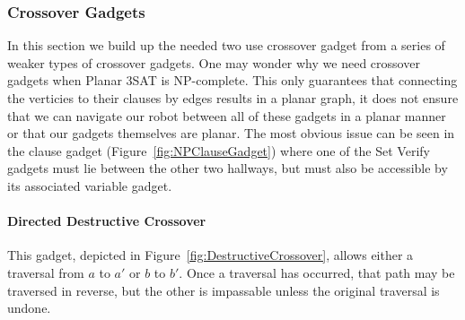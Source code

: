 %

\subsubsection{Crossover Gadgets}
\label{sec:NPCrossover}
In this section we build up the needed two use crossover gadget from a series of weaker types of crossover gadgets. One may wonder why we need crossover gadgets when Planar 3SAT is NP-complete. This only guarantees that connecting the verticies to their clauses by edges results in a planar graph, it does not ensure that we can navigate our robot between all of these gadgets in a planar manner or that our gadgets themselves are planar. The most obvious issue can be seen in the clause gadget (Figure~\ref{fig:NPClauseGadget}) where one of the Set Verify gadgets must lie between the other two hallways, but must also be accessible by its associated variable gadget.

\paragraph{Directed Destructive Crossover} This gadget, depicted in Figure~\ref{fig:DestructiveCrossover}, allows either a traversal from $a$ to $a'$ or $b$ to $b'$. Once a traversal has occurred, that path may be traversed in reverse, but the other is impassable unless the original traversal is undone.


